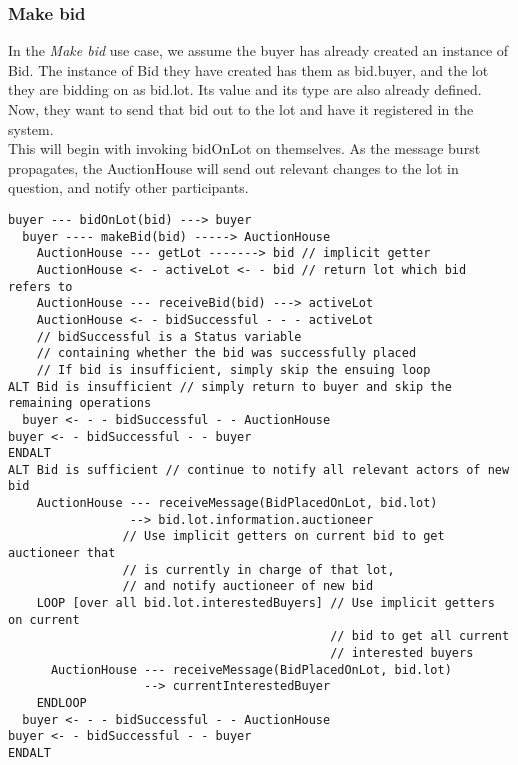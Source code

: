 \documentclass[titlepage, 12pt]{extarticle}
\begin{document}
\subsubsection{Make bid}
In the {\it Make bid} use case, we assume the buyer has already created an instance of Bid. The instance of Bid they have created has them as bid.buyer, and the lot they are bidding on as bid.lot. Its value and its type are also already defined.\\
Now, they want to send that bid out to the lot and have it registered in the system.\\
This will begin with invoking bidOnLot on themselves. As the message burst propagates, the AuctionHouse will send out relevant changes to the lot in question, and notify other participants.
\begin{verbatim}
buyer --- bidOnLot(bid) ---> buyer
  buyer ---- makeBid(bid) -----> AuctionHouse
    AuctionHouse --- getLot -------> bid // implicit getter
    AuctionHouse <- - activeLot <- - bid // return lot which bid refers to
    AuctionHouse --- receiveBid(bid) ---> activeLot
    AuctionHouse <- - bidSuccessful - - - activeLot  
    // bidSuccessful is a Status variable      
    // containing whether the bid was successfully placed
    // If bid is insufficient, simply skip the ensuing loop
ALT Bid is insufficient // simply return to buyer and skip the remaining operations
  buyer <- - - bidSuccessful - - AuctionHouse
buyer <- - bidSuccessful - - buyer
ENDALT
ALT Bid is sufficient // continue to notify all relevant actors of new bid
    AuctionHouse --- receiveMessage(BidPlacedOnLot, bid.lot) 
                 --> bid.lot.information.auctioneer 
                // Use implicit getters on current bid to get auctioneer that
                // is currently in charge of that lot,
                // and notify auctioneer of new bid
    LOOP [over all bid.lot.interestedBuyers] // Use implicit getters on current
                                             // bid to get all current
                                             // interested buyers
      AuctionHouse --- receiveMessage(BidPlacedOnLot, bid.lot) 
                   --> currentInterestedBuyer
    ENDLOOP
  buyer <- - - bidSuccessful - - AuctionHouse
buyer <- - bidSuccessful - - buyer
ENDALT
\end{verbatim}




\end{document}
